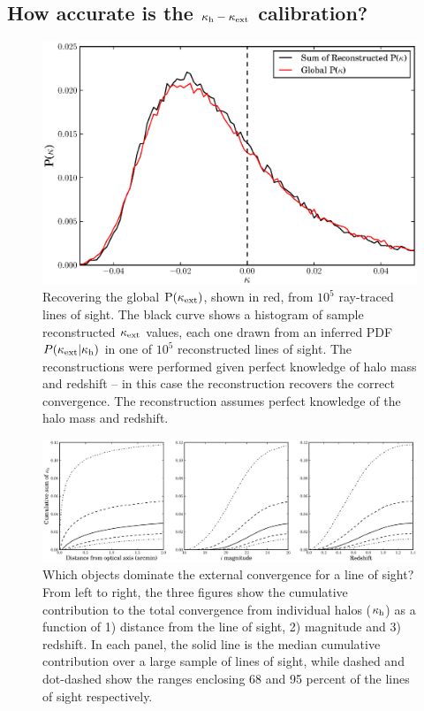 \documentclass[useAMS,usenatbib,a4paper]{mn2e}
\begin{document}

\subsection{How accurate is the $\kappa_{\rm h} - \kappa_{\rm ext}$ calibration?}

\begin{figure}
\includegraphics[width=\columnwidth]{figs/globaldist.eps}
\caption[magcut]{Recovering the global ${\rm P}(\kappa_{\rm ext})$, shown in red, 
from $10^{5}$ ray-traced lines of
sight. The black curve shows a histogram of 
sample reconstructed 
$\kappa_{\rm ext}$ values, each one drawn from an inferred PDF 
$P(\kappa_{\rm ext}|\kappa_{\rm h})$ in one of $10^{5}$ reconstructed lines of sight. 
The reconstructions were performed given
perfect knowledge of halo mass and redshift -- in this case
the reconstruction recovers the correct convergence. The reconstruction assumes
perfect knowledge of the halo mass and redshift.}
\label{fig:globaldist}
\end{figure}

\begin{figure}
\includegraphics[width=\textwidth]{figs/where_is_the_kappa.eps}
\caption[magcut]{Which objects dominate the external convergence for a line of
sight? From left to right, the three figures show the cumulative contribution
to the total  convergence from individual halos ($\kappa_{\rm h}$) as a function of
1)  distance from the line of sight, 2) magnitude and 3) redshift.   In each
panel, the solid line is the median cumulative contribution over a large
sample of lines of sight, while dashed and dot-dashed show the ranges enclosing 68
and 95 percent of the lines of sight respectively.}
\label{fig:where}
\end{figure}
\end{document}
